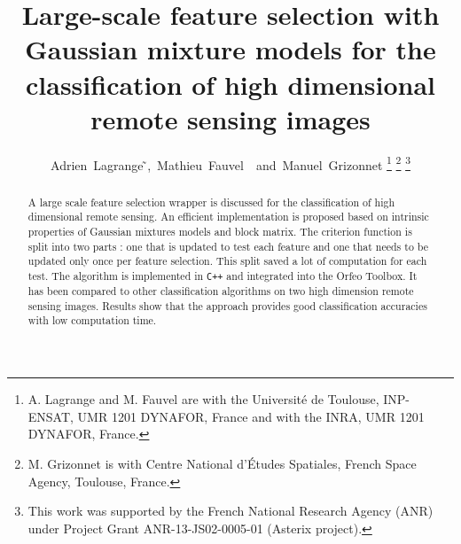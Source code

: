 \documentclass[journal,10pt]{IEEEtran}
\begin{document}
%
\title{Large-scale feature selection with Gaussian mixture models for the classification of high dimensional remote sensing images}
%
%
%

\author{Adrien~Lagrange ̃,~Mathieu~Fauvel~~and~Manuel~Grizonnet%
\thanks{A. Lagrange and M. Fauvel are with the Universit\'{e} de Toulouse,
INP-ENSAT, UMR 1201 DYNAFOR, France and with the INRA, UMR 1201
DYNAFOR, France.}%
\thanks{M. Grizonnet is with Centre National d'\'{E}tudes Spatiales, French Space Agency, Toulouse, France.}%
\thanks{This  work was  supported  by the  French National  Research Agency  (ANR)  under  Project Grant  ANR-13-JS02-0005-01  (Asterix project).}}


\maketitle

\begin{abstract}
  A  large  scale  feature  selection wrapper  is  discussed  for  the
  classification  of high  dimensional  remote  sensing. An  efficient
  implementation is proposed based on intrinsic properties of Gaussian
  mixtures models and  block matrix.  The criterion  function is split
  into two parts  : one that is  updated to test each  feature and one
  that needs to be updated only once per feature selection. This split
  saved  a  lot  of  computation  for each  test.   The  algorithm  is
  implemented in  \texttt{C++} and integrated into  the Orfeo Toolbox.
  It has been compared to  other classification algorithms on two high
  dimension remote sensing images. Results show that the approach
  provides good classification accuracies with low computation time.
\end{abstract}
\end{document}
